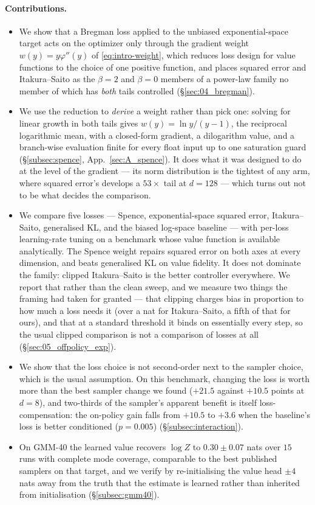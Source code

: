 \paragraph{Contributions.}
\begin{itemize}\itemsep2pt
\item We show that a Bregman loss applied to the unbiased exponential-space
  target acts on the optimizer only through the gradient weight
  $w(y)=y\varphi''(y)$ of \eqref{eq:intro-weight}, which reduces loss design
  for value functions to the choice of one positive function, and places
  squared error and Itakura--Saito as the $\beta=2$ and $\beta=0$ members of a
  power-law family no member of which has \emph{both} tails controlled
  (\S\ref{sec:04_bregman}).
\item We use the reduction to \emph{derive} a weight rather than pick one:
  solving for linear growth in both tails gives $w(y)=\ln y/(y-1)$, the
  reciprocal logarithmic mean, with a closed-form gradient, a dilogarithm
  value, and a branch-wise evaluation finite for every float input up to one
  saturation guard (\S\ref{subsec:spence}, App.~\ref{sec:A_spence}). It does
  what it was designed to do at the level of the gradient --- its norm
  distribution is the tightest of any arm, where squared error's develops a
  $53\times$ tail at $d=128$ --- which turns out not to be what decides the
  comparison.
\item We compare five losses --- Spence, exponential-space squared error,
  Itakura--Saito, generalised KL, and the biased log-space baseline --- with
  per-loss learning-rate tuning on a benchmark whose value function is
  available analytically. The Spence weight repairs squared error on both
  axes at every dimension, and beats generalised KL on value fidelity. It does
  not dominate the family: clipped Itakura--Saito is the better controller
  everywhere. We report that rather than the clean sweep, and we measure two
  things the framing had taken for granted --- that clipping charges bias in
  proportion to how much a loss needs it (over a nat for Itakura--Saito,
  a fifth of that for ours), and that at a standard threshold it binds on
  essentially every step, so the usual clipped comparison is not a comparison
  of losses at all (\S\ref{sec:05_offpolicy_exp}).
\item We show that the loss choice is not second-order next to the sampler
  choice, which is the usual assumption. On this benchmark, changing the loss
  is worth more than the best sampler change we found ($+21.5$ against $+10.5$
  points at $d=8$), and two-thirds of the sampler's apparent benefit is itself
  loss-compensation: the on-policy gain falls from $+10.5$ to $+3.6$ when the
  baseline's loss is better conditioned ($p=0.005$)
  (\S\ref{subsec:interaction}).
\item On GMM-40 the learned value recovers $\log Z$ to $0.30\pm0.07$ nats
  over $15$ runs with complete mode coverage, comparable to the best published
  samplers on that target, and we verify by re-initialising the value head
  $\pm4$ nats away from the truth that the estimate is learned rather than
  inherited from initialisation (\S\ref{subsec:gmm40}).
\end{itemize}
